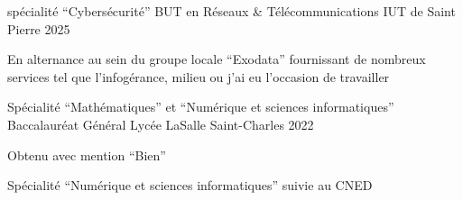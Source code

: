 
\begin{cventries}
  \cventry
    {spécialité ``Cybersécurité''}
    {BUT en Réseaux \& Télécommunications}
    {IUT de Saint Pierre}
    {2025}
    {
      \begin{cvitems}
        \item {En alternance au sein du groupe locale ``Exodata'' fournissant de nombreux services tel que l'infogérance, milieu ou j'ai eu l'occasion de travailler}
      \end{cvitems}
    }

  \cventry
    {Spécialité ``Mathématiques'' et ``Numérique et sciences informatiques''}
    {Baccalauréat Général}
    {Lycée LaSalle Saint-Charles}
    {2022}
    {
      \begin{cvitems}
        \item {Obtenu avec mention ``Bien''}
        \item {Spécialité ``Numérique et sciences informatiques'' suivie au CNED}
      \end{cvitems}
    }
\end{cventries}
